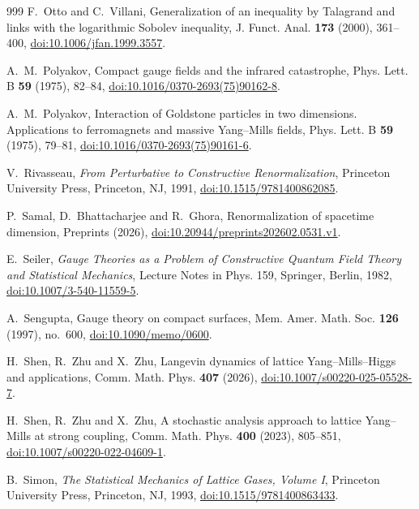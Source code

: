 \documentclass[aps,prd,twocolumn,superscriptaddress,nofootinbib,longbibliography,floatfix,amsmath,amssymb,10pt]{revtex4-2}
\theoremstyle{definition}
\theoremstyle{remark}
\begin{document}
\begin{thebibliography}{999}
F.~Otto and C.~Villani, Generalization of an inequality by Talagrand and
links with the logarithmic Sobolev inequality, J. Funct. Anal. \textbf{173}
(2000), 361--400,
\href{https://doi.org/10.1006/jfan.1999.3557}{doi:10.1006/jfan.1999.3557}.

A.~M.~Polyakov, Compact gauge fields and the infrared catastrophe, Phys.
Lett. B \textbf{59} (1975), 82--84,
\href{https://doi.org/10.1016/0370-2693(75)90162-8}{doi:10.1016/0370-2693(75)90162-8}.

A.~M.~Polyakov, Interaction of Goldstone particles in two dimensions.
Applications to ferromagnets and massive Yang--Mills fields, Phys. Lett. B
\textbf{59} (1975), 79--81,
\href{https://doi.org/10.1016/0370-2693(75)90161-6}{doi:10.1016/0370-2693(75)90161-6}.

V.~Rivasseau, \emph{From Perturbative to Constructive Renormalization},
Princeton University Press, Princeton, NJ, 1991,
\href{https://doi.org/10.1515/9781400862085}{doi:10.1515/9781400862085}.

P.~Samal, D.~Bhattacharjee and R.~Ghora, Renormalization of spacetime
dimension, Preprints (2026),
\href{https://doi.org/10.20944/preprints202602.0531.v1}
{doi:10.20944/preprints202602.0531.v1}.

E.~Seiler, \emph{Gauge Theories as a Problem of Constructive Quantum Field
Theory and Statistical Mechanics}, Lecture Notes in Phys. 159, Springer,
Berlin, 1982, \href{https://doi.org/10.1007/3-540-11559-5}{doi:10.1007/3-540-11559-5}.

A.~Sengupta, Gauge theory on compact surfaces, Mem. Amer. Math. Soc.
\textbf{126} (1997), no.~600,
\href{https://doi.org/10.1090/memo/0600}{doi:10.1090/memo/0600}.

H.~Shen, R.~Zhu and X.~Zhu, Langevin dynamics of lattice Yang--Mills--Higgs and
applications, Comm. Math. Phys. \textbf{407} (2026),
\href{https://doi.org/10.1007/s00220-025-05528-7}{doi:10.1007/s00220-025-05528-7}.

H.~Shen, R.~Zhu and X.~Zhu, A stochastic analysis approach to lattice
Yang--Mills at strong coupling, Comm. Math. Phys. \textbf{400} (2023),
805--851, \href{https://doi.org/10.1007/s00220-022-04609-1}{doi:10.1007/s00220-022-04609-1}.

B.~Simon, \emph{The Statistical Mechanics of Lattice Gases, Volume I},
Princeton University Press, Princeton, NJ, 1993,
\href{https://doi.org/10.1515/9781400863433}{doi:10.1515/9781400863433}.


\end{thebibliography}
\end{document}
